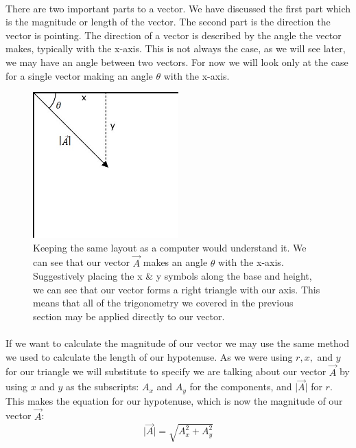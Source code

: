 \documentclass[12pt, letterpaper]{report}
\begin{document}
	\paragraph{} There are two important parts to a vector. We have discussed the first part which is the magnitude or length of the vector. The second part is the direction the vector is pointing. The direction of a vector is described by the angle the vector makes, typically with the x-axis. This is not always the case, as we will see later, we may have an angle between two vectors. For now we will look only at the case for a single vector making an angle $\theta$ with the x-axis.
	\begin{figure}[h]
	\centering
	\includegraphics[width=0.5\textwidth]{Processing Images/VectorAngIntro/VectorAngIntro.jpg}
	\caption{Keeping the same layout as a computer would understand it. We can see that our vector $\vec{A}$ makes an angle $\theta$ with the x-axis. Suggestively placing the x \& y symbols along the base and height, we can see that our vector forms a right triangle with our axis. This means that all of the trigonometry we covered in the previous section may be applied directly to our vector.}
	\end{figure}
	\paragraph{} If we want to calculate the magnitude of our vector we may use the same method we used to calculate the length of our hypotenuse. As we were using $r, x,$ and $y$ for our triangle we will substitute to specify we are talking about our vector $\vec{A}$ by using $x$ and $y$ as the subscripts: $A_x$ and $A_y$ for the components, and $\lvert\vec{A}\rvert$ for $r$. This makes the equation for our hypotenuse, which is now the magnitude of our vector $\vec{A}$:
	\begin{equation*}
	\lvert\vec{A}\rvert = \sqrt{A_x^2 + A_y^2}
	\end{equation*}
\end{document}
